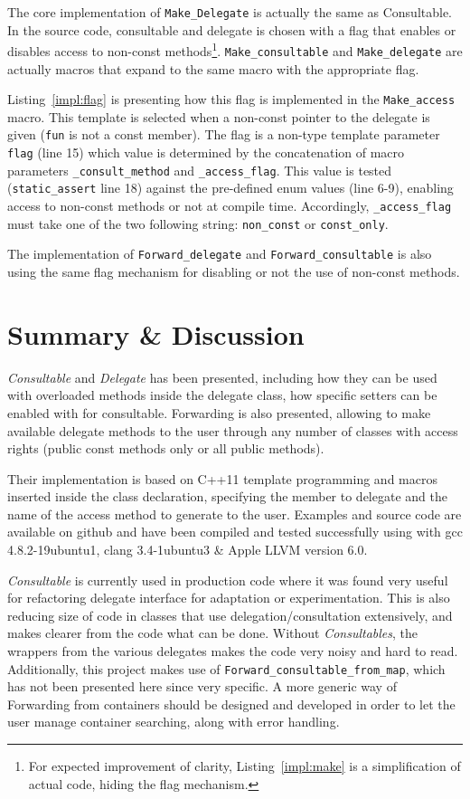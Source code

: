 \documentclass{article}
\begin{document}
The core implementation of \verb+Make_Delegate+ is actually the same as Consultable. In the source code, consultable and delegate is chosen with a flag that enables or disables access to non-const methods\footnote{For expected improvement of clarity, Listing~\ref{impl:make} is a simplification of actual code, hiding the flag mechanism.}. \verb+Make_consultable+ and \verb+Make_delegate+ are actually macros that expand to the same macro with the appropriate flag. 

Listing~\ref{impl:flag} is presenting how this flag is implemented in the \verb+Make_access+ macro. This template is selected when a non-const pointer to the delegate is given (\verb+fun+ is not a const member). The flag is a non-type template parameter \verb+flag+ (line 15) which value is determined by the concatenation of macro parameters \verb+_consult_method+ and \verb+_access_flag+. This value is tested (\verb+static_assert+ line 18) against the pre-defined enum values (line 6-9), enabling access to non-const methods or not at compile time. Accordingly, \verb+_access_flag+ must take one of the two following string: \verb+non_const+ or \verb+const_only+.   
 
The implementation of \verb+Forward_delegate+ and \verb+Forward_consultable+ is also using the same flag mechanism for disabling or not the use of non-const methods. 

\section{Summary \& Discussion}
\textit{Consultable} and \textit{Delegate} has been presented, including how they can be used with overloaded methods inside the delegate class, how specific setters can be enabled with for consultable. Forwarding is also presented, allowing to make available delegate methods to the user through any number of classes with access rights (public const methods only or all public methods). 

Their implementation is based on C++11 template programming and macros inserted inside the class declaration, specifying the member to delegate and the name of the access method to generate to the user. Examples and source code are available on github and have been compiled and tested successfully using with gcc 4.8.2-19ubuntu1, clang 3.4-1ubuntu3 \& Apple LLVM version 6.0.

\textit{Consultable} is currently used in production code where it was found very useful for refactoring delegate interface for adaptation or experimentation. This is also reducing size of code in classes that use delegation/consultation extensively, and makes clearer from the code what can be done. Without \textit{Consultables}, the wrappers from the various delegates makes the code very noisy and hard to read. Additionally, this project makes use of \verb+Forward_consultable_from_map+, which has not been presented here since very specific. A more generic way of Forwarding from containers should be designed and developed in order to let the user manage container searching, along with error handling.
\end{document}
